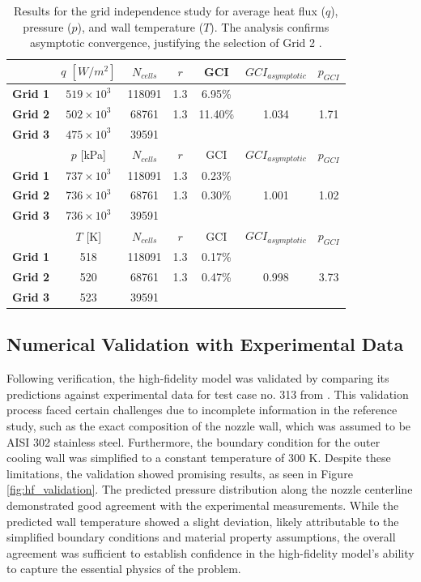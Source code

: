 \documentclass[tg, EN]{ufabcFHZh_tg}
\begin{document}
\begin{table}[H]
\centering
\caption{Results for the grid independence study for average heat flux ($q$), pressure ($p$), and wall temperature ($T$). The analysis confirms asymptotic convergence, justifying the selection of Grid 2 \citep{moreira2023}.}
\label{tab:grid_independence_results}
\begin{tabular}{lcccccc}
\toprule
 & $q$ $[W/m^2]$ & $N_{cells}$ & $r$ & GCI & $GCI_{asymptotic}$ & $p_{GCI}$ \\
\midrule
\textbf{Grid 1} & $519 \times 10^3$ & 118091 & 1.3 & 6.95\% & & \\
\textbf{Grid 2} & $502 \times 10^3$ & 68761 & 1.3 & 11.40\% & 1.034 & 1.71 \\
\textbf{Grid 3} & $475 \times 10^3$ & 39591 & & & & \\
\midrule
 & $p$ [kPa] & $N_{cells}$ & $r$ & GCI & $GCI_{asymptotic}$ & $p_{GCI}$ \\
\midrule
\textbf{Grid 1} & $737 \times 10^3$ & 118091 & 1.3 & 0.23\% & & \\
\textbf{Grid 2} & $736 \times 10^3$ & 68761 & 1.3 & 0.30\% & 1.001 & 1.02 \\
\textbf{Grid 3} & $736 \times 10^3$ & 39591 & & & & \\
\midrule
 & $T$ [K] & $N_{cells}$ & $r$ & GCI & $GCI_{asymptotic}$ & $p_{GCI}$ \\
\midrule
\textbf{Grid 1} & 518 & 118091 & 1.3 & 0.17\% & & \\
\textbf{Grid 2} & 520 & 68761 & 1.3 & 0.47\% & 0.998 & 3.73 \\
\textbf{Grid 3} & 523 & 39591 & & & & \\
\bottomrule
\end{tabular}%
\end{table}


\subsection{Numerical Validation with Experimental Data}

Following verification, the high-fidelity model was validated by comparing its predictions against experimental data for test case no. 313 from \citep{back1964}. This validation process faced certain challenges due to incomplete information in the reference study, such as the exact composition of the nozzle wall, which was assumed to be AISI 302 stainless steel. Furthermore, the boundary condition for the outer cooling wall was simplified to a constant temperature of 300 K. Despite these limitations, the validation showed promising results, as seen in Figure \ref{fig:hf_validation}. The predicted pressure distribution along the nozzle centerline demonstrated good agreement with the experimental measurements. While the predicted wall temperature showed a slight deviation, likely attributable to the simplified boundary conditions and material property assumptions, the overall agreement was sufficient to establish confidence in the high-fidelity model's ability to capture the essential physics of the problem.
\end{document}
